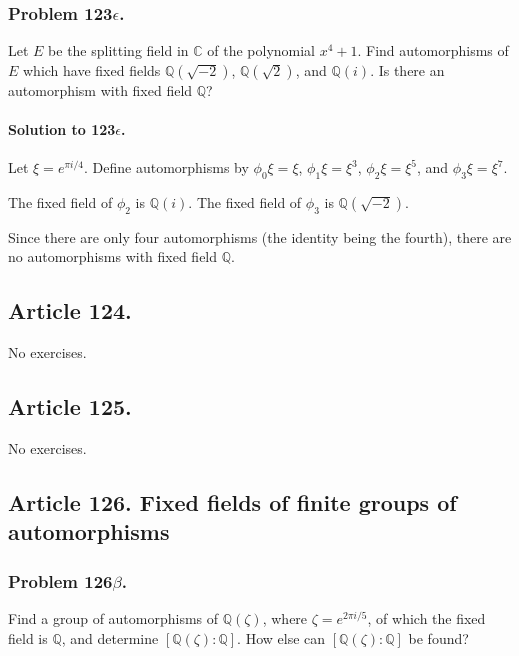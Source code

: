 \subsubsection{Problem 123$\epsilon$.}
Let $E$ be the splitting field in $\mathbb{C}$ of the polynomial $x^4 + 1$.
Find automorphisms of $E$ which have fixed fields $\mathbb{Q}(\sqrt{-2})$,
$\mathbb{Q}(\sqrt{2})$, and $\mathbb{Q}(i)$. Is there an automorphism
with fixed field $\mathbb{Q}$?

\paragraph*{Solution to 123$\epsilon$.}
Let $\xi = e^{\pi i / 4}$. Define automorphisms by
$\phi_0 \xi = \xi$,
$\phi_1 \xi = \xi^3$, $\phi_2 \xi = \xi^5$, and
$\phi_3 \xi = \xi^7$.

The fixed field of $\phi_2$ is $\mathbb{Q}(i)$. The fixed field of $\phi_3$
is $\mathbb{Q}(\sqrt{-2})$.

Since there are only four automorphisms (the identity being the fourth),
there are no automorphisms with fixed field $\mathbb{Q}$.
\subsection{Article 124.}

No exercises.
\subsection{Article 125.}

No exercises.
\subsection{Article 126. Fixed fields of finite groups of automorphisms}
\subsubsection{Problem 126$\beta$.}
Find a group of automorphisms of $\mathbb{Q}(\zeta)$, where $\zeta = e^{2\pi i /5}$,
of which the fixed field is $\mathbb{Q}$, and determine
$\left[\mathbb{Q}(\zeta):\mathbb{Q}\right]$. How else can
$\left[\mathbb{Q}(\zeta):\mathbb{Q}\right]$ be found?

